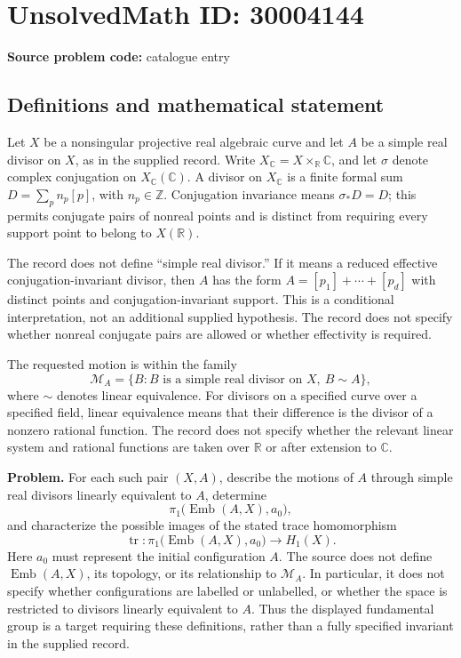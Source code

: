 \documentclass[11pt]{article}
\newcommand{\Z}{\mathbb{Z}}
\newcommand{\R}{\mathbb{R}}
\newcommand{\C}{\mathbb{C}}
\begin{document}
\section*{UnsolvedMath ID: 30004144}
\textbf{Source problem code:} catalogue entry
\subsection{Definitions and mathematical statement}
Let \(X\) be a nonsingular projective real algebraic curve and let \(A\) be a simple real divisor on \(X\), as in the supplied record. Write \(X_{\C}=X\times_{\R}\C\), and let \(\sigma\) denote complex conjugation on \(X_{\C}(\C)\). A divisor on \(X_{\C}\) is a finite formal sum \(D=\sum_p n_p[p]\), with \(n_p\in\Z\). Conjugation invariance means \(\sigma_*D=D\); this permits conjugate pairs of nonreal points and is distinct from requiring every support point to belong to \(X(\R)\).

The record does not define ``simple real divisor.'' If it means a reduced effective conjugation-invariant divisor, then \(A\) has the form \(A=[p_1]+\cdots+[p_d]\) with distinct points and conjugation-invariant support. This is a conditional interpretation, not an additional supplied hypothesis. The record does not specify whether nonreal conjugate pairs are allowed or whether effectivity is required.

The requested motion is within the family
\[
\mathcal M_A=\{B:B\text{ is a simple real divisor on }X,\ B\sim A\},
\]
where \(\sim\) denotes linear equivalence. For divisors on a specified curve over a specified field, linear equivalence means that their difference is the divisor of a nonzero rational function. The record does not specify whether the relevant linear system and rational functions are taken over \(\R\) or after extension to \(\C\).

\textbf{Problem.} For each such pair \((X,A)\), describe the motions of \(A\) through simple real divisors linearly equivalent to \(A\), determine
\[
\pi_1\bigl(\operatorname{Emb}(A,X),a_0\bigr),
\]
and characterize the possible images of the stated trace homomorphism
\[
\operatorname{tr}:\pi_1\bigl(\operatorname{Emb}(A,X),a_0\bigr)\longrightarrow H_1(X).
\]
Here \(a_0\) must represent the initial configuration \(A\). The source does not define \(\operatorname{Emb}(A,X)\), its topology, or its relationship to \(\mathcal M_A\). In particular, it does not specify whether configurations are labelled or unlabelled, or whether the space is restricted to divisors linearly equivalent to \(A\). Thus the displayed fundamental group is a target requiring these definitions, rather than a fully specified invariant in the supplied record.
\end{document}
